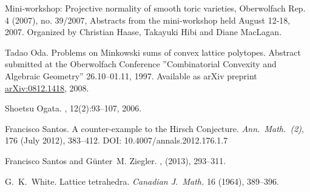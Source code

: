 \documentclass{amsart}
\theoremstyle{plain}
\theoremstyle{definition}
\begin{document}
\begin{thebibliography}{99}
Mini-workshop: Projective normality of smooth toric varieties, Oberwolfach Rep. 4 (2007), no. 39/2007, Abstracts from the mini-workshop held August 12-18, 2007. Organized by Christian Haase, Takayuki Hibi and Diane MacLagan.

Tadao Oda. Problems on Minkowski sums of convex lattice polytopes. 
Abstract submitted at the Oberwolfach Conference ''Combinatorial Convexity and Algebraic Geometry'' 26.10--01.11, 1997.
Available as arXiv preprint \href{https://arxiv.org/abs/0812.1418}{arXiv:0812.1418}, 2008.

Shoetsu Ogata.
, 12(2):93--107, 2006.

Francisco Santos.
A counter-example to the Hirsch Conjecture.
\emph{Ann.~Math.~(2)}, 176 (July 2012), 383--412. 
DOI: 10.4007/annals.2012.176.1.7

Francisco Santos and G{\"u}nter~M. Ziegler.
, 
 (2013), 293--311. %

G.~K.~White.
Lattice tetrahedra.
\emph{Canadian J.~Math.} 16 (1964), 389--396.

\end{thebibliography}
\end{document}

